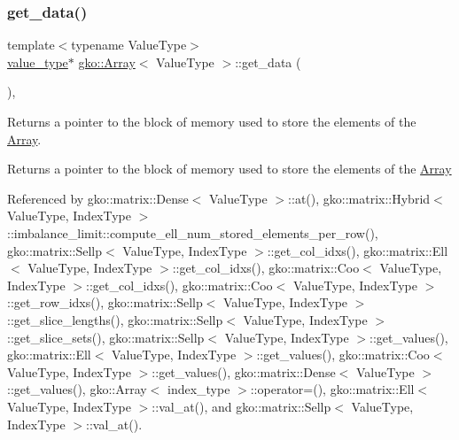 \mbox{\label{classgko_1_1Array_a9acf29878703bb8767e3cea2ba499dae}} 
\subsubsection{\texorpdfstring{get\+\_\+data()}{get\_data()}}
{\footnotesize\ttfamily template$<$typename Value\+Type$>$ \\
\hyperlink{classgko_1_1Array_ad40c95e429262175cae51bcabd291a5b}{value\+\_\+type}$\ast$ \hyperlink{classgko_1_1Array}{gko\+::\+Array}$<$ Value\+Type $>$\+::get\+\_\+data (\begin{DoxyParamCaption}{ }\end{DoxyParamCaption})\hspace{0.3cm}{\ttfamily [inline]}, {\ttfamily [noexcept]}}



Returns a pointer to the block of memory used to store the elements of the \hyperlink{classgko_1_1Array}{Array}. 

\begin{DoxyReturn}{Returns}
a pointer to the block of memory used to store the elements of the \hyperlink{classgko_1_1Array}{Array} 
\end{DoxyReturn}


Referenced by gko\+::matrix\+::\+Dense$<$ Value\+Type $>$\+::at(), gko\+::matrix\+::\+Hybrid$<$ Value\+Type, Index\+Type $>$\+::imbalance\+\_\+limit\+::compute\+\_\+ell\+\_\+num\+\_\+stored\+\_\+elements\+\_\+per\+\_\+row(), gko\+::matrix\+::\+Sellp$<$ Value\+Type, Index\+Type $>$\+::get\+\_\+col\+\_\+idxs(), gko\+::matrix\+::\+Ell$<$ Value\+Type, Index\+Type $>$\+::get\+\_\+col\+\_\+idxs(), gko\+::matrix\+::\+Coo$<$ Value\+Type, Index\+Type $>$\+::get\+\_\+col\+\_\+idxs(), gko\+::matrix\+::\+Coo$<$ Value\+Type, Index\+Type $>$\+::get\+\_\+row\+\_\+idxs(), gko\+::matrix\+::\+Sellp$<$ Value\+Type, Index\+Type $>$\+::get\+\_\+slice\+\_\+lengths(), gko\+::matrix\+::\+Sellp$<$ Value\+Type, Index\+Type $>$\+::get\+\_\+slice\+\_\+sets(), gko\+::matrix\+::\+Sellp$<$ Value\+Type, Index\+Type $>$\+::get\+\_\+values(), gko\+::matrix\+::\+Ell$<$ Value\+Type, Index\+Type $>$\+::get\+\_\+values(), gko\+::matrix\+::\+Coo$<$ Value\+Type, Index\+Type $>$\+::get\+\_\+values(), gko\+::matrix\+::\+Dense$<$ Value\+Type $>$\+::get\+\_\+values(), gko\+::\+Array$<$ index\+\_\+type $>$\+::operator=(), gko\+::matrix\+::\+Ell$<$ Value\+Type, Index\+Type $>$\+::val\+\_\+at(), and gko\+::matrix\+::\+Sellp$<$ Value\+Type, Index\+Type $>$\+::val\+\_\+at().

